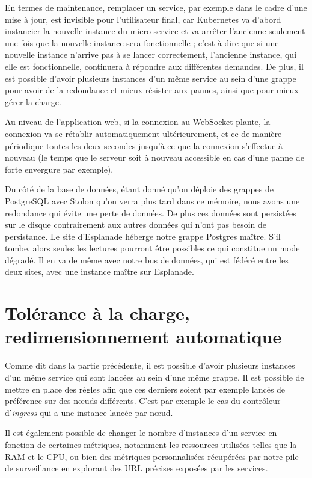En termes de maintenance, remplacer un service, par exemple dans le
cadre d'une mise à jour, est invisible pour l'utilisateur final, car
Kubernetes va d'abord instancier la nouvelle instance du micro-service
et va arrêter l'ancienne seulement une fois que la nouvelle instance
sera fonctionnelle ; c'est-à-dire que si une nouvelle instance n'arrive
pas à se lancer correctement, l'ancienne instance, qui elle est
fonctionnelle, continuera à répondre aux différentes demandes. De plus,
il est possible d'avoir plusieurs instances d'un même service au sein
d'une grappe pour avoir de la redondance et mieux résister aux pannes,
ainsi que pour mieux gérer la charge.

Au niveau de l'application web, si la connexion au WebSocket plante, la
connexion va se rétablir automatiquement ultérieurement, et ce de
manière périodique toutes les deux secondes jusqu'à ce que la connexion
s'effectue à nouveau (le temps que le serveur soit à nouveau accessible
en cas d'une panne de forte envergure par exemple).

Du côté de la base de données, étant donné qu'on déploie des grappes
de PostgreSQL avec Stolon qu'on verra plus tard dans ce mémoire, nous
avons une redondance qui évite une perte de données. De plus ces données
sont persistées sur le disque contrairement aux autres données qui n'ont
pas besoin de persistance. Le site d'Esplanade héberge notre grappe
Postgres maître. S'il tombe, alors seules les lectures pourront être
possibles ce qui constitue un mode dégradé. Il en va de même avec notre
bus de données, qui est fédéré entre les deux sites, avec une instance
maître sur Esplanade.

\section{Tolérance à la charge, redimensionnement automatique}

Comme dit dans la partie précédente, il est possible d'avoir plusieurs
instances d'un même service qui sont lancées au sein d'une même grappe.
Il est possible de mettre en place des règles afin que ces derniers
soient par exemple lancés de préférence sur des nœuds différents. C'est
par exemple le cas du contrôleur d'\textit{ingress} qui a une instance
lancée par nœud.

Il est également possible de changer le nombre d'instances d'un service
en fonction de certaines métriques, notamment les ressources utilisées
telles que la RAM et le CPU, ou bien des métriques personnalisées
récupérées par notre pile de surveillance en explorant des URL précises
exposées par les services.

